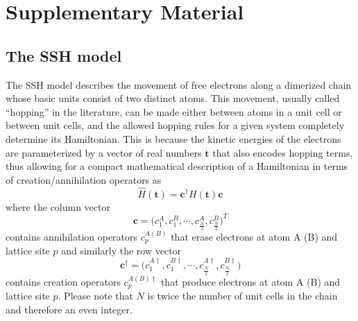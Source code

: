 \documentclass[fleqn,10pt]{wlscirep}
\begin{document}
\section*{Supplementary Material}
\subsection*{The SSH model}
\label{sshapp}

The SSH model \cite{asboth2016short} describes the movement of free electrons along a dimerized chain whose basic units consist of two distinct atoms. This movement, usually called ``hopping'' in the literature, can be made either between atoms in a unit cell or between unit cells, and the allowed hopping rules for a given system completely determine its Hamiltonian. This is because the kinetic energies of the electrons are parameterized by a vector of real numbers $\mathbf{t}$ that also encodes hopping terms, thus allowing for a compact mathematical description of a Hamiltonian in terms of creation/annihilation operators as
\begin{equation}
\label{SSH}
\hat{H}(\mathbf{t})=\mathbf{c}^{\dagger}H(\mathbf{t})\mathbf{c}
\end{equation}
where the column vector
\begin{equation*}
\mathbf{c} =\Big(c^{A}_1,c^{B}_1,\cdots,c^{A}_\frac{N}{2},c^{B}_\frac{N}{2}\Big)^T
\end{equation*}
contains annihilation operators $c^{A(B)}_p$ that erase electrons at atom A (B) and lattice site $p$ and similarly the row vector
\begin{equation*}
\mathbf{c}^\dagger =\Big(c^{A\dagger}_1,c^{B\dagger}_1,\cdots,c^{A\dagger}_\frac{N}{2},c^{B\dagger}_\frac{N}{2}\Big)
\end{equation*}
contains creation operators $c^{A(B)\dagger}_p$ that produce electrons at atom A (B) and lattice site $p$. Please note that $N$ is twice the number of unit cells in the chain and therefore an even integer.
\end{document}
